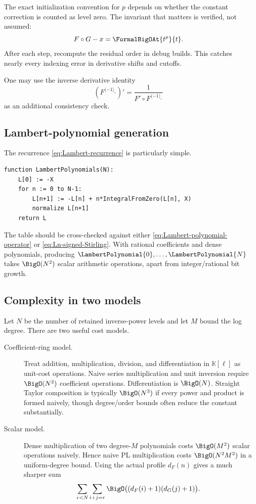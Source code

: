 \documentclass[11pt,oneside]{article}
\numberwithin{equation}{section}
\theoremstyle{definition}
\newcommand{\K}{\mathbb{K}}
\newcommand{\rev}{\langle-1\rangle_{\circ}}
\begin{document}
The exact initialization convention for \(p\) depends on whether the constant
correction is counted as level zero.  The invariant that matters is verified,
not assumed:
\[
  F\circ G-x=\FormalBigOAt{t^p}{t}.
\]
After each step, recompute the residual order in debug builds.  This catches
nearly every indexing error in derivative shifts and cutoffs.

One may use the inverse derivative identity
\begin{equation}\label{eq:inverse-derivative-identity}
  (F^{\rev})'=\frac{1}{F'\circ F^{\rev}}
\end{equation}
as an additional consistency check.

\subsection{Lambert-polynomial generation}

The recurrence \eqref{eq:Lambert-recurrence} is particularly simple.

\begin{lstlisting}[style=pseudocode,caption={Exact Lambert polynomials.}]
function LambertPolynomials(N):
    L[0] := -X
    for n := 0 to N-1:
        L[n+1] := -L[n] + n*IntegralFromZero(L[n], X)
        normalize L[n+1]
    return L
\end{lstlisting}

The table should be cross-checked against either
\eqref{eq:Lambert-polynomial-operator} or
\eqref{eq:Ln-signed-Stirling}.  With rational coefficients and dense
polynomials, producing \(\LambertPolynomial{0},\ldots,\LambertPolynomial{N}\) takes \(\BigO(N^2)\) scalar arithmetic
operations, apart from integer/rational bit growth.

\subsection{Complexity in two models}

Let \(N\) be the number of retained inverse-power levels and let \(M\) bound the
log degree.  There are two useful cost models.

\begin{description}
\item[Coefficient-ring model.]  Treat addition, multiplication, division, and
  differentiation in \(\K[\ell]\) as unit-cost operations.  Naive series
  multiplication and unit inversion require \(\BigO(N^2)\) coefficient operations.
  Differentiation is \(\BigO(N)\).  Straight Taylor composition is typically
  \(\BigO(N^3)\) if every power and product is formed naively, though degree/order
  bounds often reduce the constant substantially.
\item[Scalar model.]  Dense multiplication of two degree-\(M\) polynomials costs
  \(\BigO(M^2)\) scalar operations naively.  Hence naive PL multiplication costs
  \(\BigO(N^2M^2)\) in a uniform-degree bound.  Using the actual profile
  \(d_F(n)\) gives a much sharper sum
  \[
    \sum_{r<N}\sum_{i+j=r}
      \BigO\bigl((d_F(i)+1)(d_G(j)+1)\bigr).
  \]
\end{description}
\end{document}
